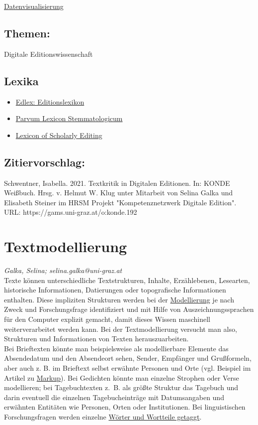 \documentclass{article}
\begin{document}
\href{https://gams.uni-graz.at/o:konde.54}{Datenvisualisierung}\subsection*{Themen:}Digitale Editionswissenschaft\subsection*{Lexika}\begin{itemize}\item \href{https://edlex.de/index.php?title=Textkritik}{Edlex: Editionslexikon}\item \href{https://wiki.helsinki.fi/display/stemmatology/Textual+criticism}{Parvum Lexicon Stemmatologicum}\item \href{https://lexiconse.uantwerpen.be/index.php/lexicon/textual-criticism/}{Lexicon of Scholarly Editing}\end{itemize}\subsection*{Zitiervorschlag:}Schwentner, Isabella. 2021. Textkritik in Digitalen Editionen. In: KONDE Weißbuch. Hrsg. v. Helmut W. Klug unter Mitarbeit von Selina Galka und Elisabeth Steiner im HRSM Projekt "Kompetenznetzwerk Digitale Edition". URL: https://gams.uni-graz.at/o:konde.192\newpage\section*{Textmodellierung} \emph{Galka, Selina; selina.galka@uni-graz.at }\\
        
    Texte können unterschiedliche Textstrukturen, Inhalte, Erzählebenen, Lesearten, historische Informationen, Datierungen oder topografische Informationen enthalten. Diese impliziten Strukturen werden bei der \href{http://gams.uni-graz.at/o:konde.137}{Modellierung} je nach Zweck und Forschungsfrage identifiziert und mit Hilfe von Auszeichnungssprachen für den Computer explizit gemacht, damit dieses Wissen maschinell weiterverarbeitet werden kann. Bei der Textmodellierung versucht man also, Strukturen und Informationen von Texten herauszuarbeiten.\\
            
        Bei Brieftexten könnte man beispielsweise als modellierbare Elemente das Absendedatum und den Absendeort sehen, Sender, Empfänger und Grußformeln, aber auch z. B. im Brieftext selbst erwähnte Personen und Orte (vgl. Beispiel im Artikel zu \href{http://gams.uni-graz.at/o:konde.126}{Markup}). Bei Gedichten könnte man einzelne Strophen oder Verse modellieren; bei Tagebuchtexten z. B. als größte Struktur das Tagebuch und darin eventuell die einzelnen Tagebucheinträge mit Datumsangaben und erwähnten Entitäten wie Personen, Orten oder Institutionen. Bei linguistischen Forschungsfragen werden einzelne \href{http://gams.uni-graz.at/o:konde.156}{Wörter und Wortteile getaggt}.\\
            
\end{document}
